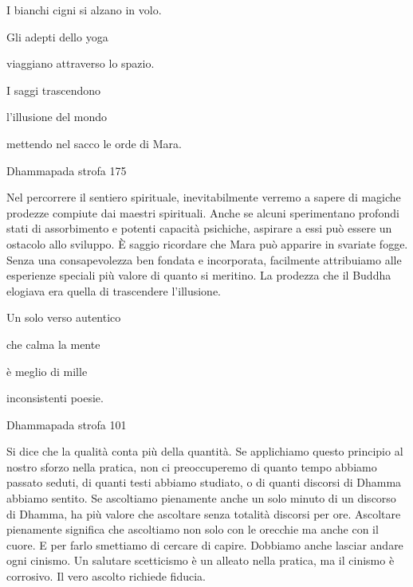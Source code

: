 \documentclass[a4paper,portrait,12pt]{article}
\begin{document}
\newpage



I bianchi cigni si alzano in volo.


Gli adepti dello yoga 


viaggiano attraverso lo spazio.


I saggi trascendono


l'illusione del mondo


mettendo nel sacco le orde di Mara.





Dhammapada strofa 175


\newpage



Nel percorrere il sentiero spirituale, inevitabilmente verremo a sapere di magiche prodezze compiute dai maestri spirituali. Anche se alcuni sperimentano profondi stati di assorbimento e potenti capacit\`{a} psichiche, aspirare a essi pu\`{o} essere un ostacolo allo sviluppo. \`{E} saggio ricordare che Mara pu\`{o} apparire in svariate fogge. Senza una consapevolezza ben fondata e incorporata, facilmente attribuiamo alle esperienze speciali più valore di quanto si meritino. La prodezza che il Buddha elogiava era quella di trascendere l'illusione. 


\newpage



Un solo verso autentico


che calma la mente


\`{e} meglio di mille	


inconsistenti poesie.





Dhammapada strofa 101


\newpage



Si dice che la qualit\`{a} conta più della quantit\`{a}. Se applichiamo questo principio al nostro sforzo nella pratica, non ci preoccuperemo di quanto tempo abbiamo passato seduti, di quanti testi abbiamo studiato, o di quanti discorsi di Dhamma abbiamo sentito. Se ascoltiamo pienamente anche un solo minuto di un discorso di Dhamma, ha più valore che ascoltare senza totalit\`{a} discorsi per ore. Ascoltare pienamente significa che ascoltiamo non solo con le orecchie ma anche con il cuore. E per farlo smettiamo di cercare di capire. Dobbiamo anche lasciar andare ogni cinismo. Un salutare scetticismo \`{e} un alleato nella pratica, ma il cinismo \`{e} corrosivo. Il vero ascolto richiede fiducia.
\end{document}

